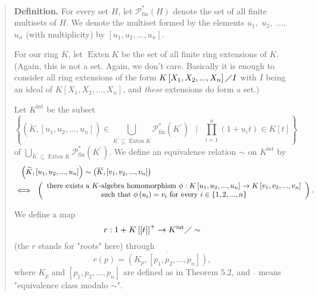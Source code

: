 \documentclass[12pt,final,notitlepage,onecolumn,german]{article}%
\begin{document}
\begin{quote}
\textbf{Definition.} For every set $H$, let $\mathcal{P}_{\operatorname*{fin}%
}^{\ast}\left(  H\right)  $ denote the set of all finite multisets of $H$. We
denote the multiset formed by the elements $u_{1},$ $u_{2},$ $...,$ $u_{n}$
(with multiplicity) by $\left[  u_{1},u_{2},...,u_{n}\right]  $.

For our ring $K$, let $\operatorname*{Exten}K$ be the set of all finite ring
extensions of $K$. (Again, this is not a set. Again, we don't care. Basically
it is enough to consider all ring extensions of the form $K\left[  X_{1}%
,X_{2},...,X_{n}\right]  \diagup I$ with $I$ being an ideal of $K\left[
X_{1},X_{2},...,X_{n}\right]  $, and \textit{these} extensions do form a set.)

Let $K^{\operatorname*{int}}$ be the subset%
\[
\left\{  \left(  \widetilde{K},\left[  u_{1},u_{2},...,u_{n}\right]  \right)
\in\bigcup_{K^{\prime}\subseteq\operatorname*{Exten}K}\mathcal{P}%
_{\operatorname*{fin}}^{\ast}\left(  K^{\prime}\right)  \ \ \mid
\ \ \prod\limits_{i=1}^{n}\left(  1+u_{i}t\right)  \in K\left[  t\right]
\right\}
\]
of $\bigcup\limits_{K^{\prime}\subseteq\operatorname*{Exten}K}\mathcal{P}%
_{\operatorname*{fin}}^{\ast}\left(  K^{\prime}\right)  $. We define an
equivalence relation $\sim$ on $K^{\operatorname*{int}}$ by%
\begin{align*}
&  \ \ \left(  \widetilde{K},\left[  u_{1},u_{2},...,u_{n}\right]  \right)
\sim\left(  \overline{K},\left[  v_{1},v_{2},...,v_{n}\right]  \right) \\
&  \Longleftrightarrow\ \ \left(
\begin{array}
[c]{c}%
\text{there exists a }K\text{-algebra homomorphism }\phi:K\left[  u_{1}%
,u_{2},...,u_{n}\right]  \rightarrow K\left[  v_{1},v_{2},...,v_{n}\right] \\
\text{such that }\phi\left(  u_{i}\right)  =v_{i}\text{ for every }%
i\in\left\{  1,2,...,n\right\}
\end{array}
\right)  .
\end{align*}


We define a map%
\[
r:1+K\left[  \left[  t\right]  \right]  ^{+}\rightarrow K^{\operatorname*{int}%
}\diagup\sim
\]
(the $r$ stands for "roots" here) through
\[
r\left(  p\right)  =\overline{\left(  K_{p},\left[  p_{1},p_{2},...,p_{n}%
\right]  \right)  },
\]
where $K_{p}$ and $\left[  p_{1},p_{2},...,p_{n}\right]  $ are defined as in
Theorem 5.2, and $\overline{}$ means "equivalence class modulo $\sim$".
\end{quote}
\end{document}
